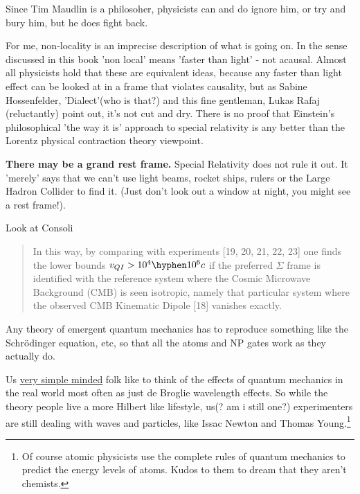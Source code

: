 \documentclass[../rzero]{subfiles}
\begin{document}
Since Tim Maudlin is a philosoher, physicists can and do ignore him, or try and bury him\cite{Werner2014}, but he does fight back\cite{WMaudlin2014}. 

For me, non-locality is an imprecise description of what is going on. In the sense discussed in this book 'non local' means 'faster than light' - not acausal. Almost all physicists hold that these are equivalent ideas, because any faster than light effect can be looked at in a frame that violates causality, but as Sabine Hossenfelder\cite{sabinehossenfelderThinkFasterLight2023}, 'Dialect'(who is that?)\cite{dialectWhatTimeDilation2023} and this fine gentleman, Lukas Rafaj (reluctantly)\cite{physics-problemsandsolutionsOneWaySpeed2023} point out, it's not cut and dry. There is no proof that Einstein's philosophical 'the way it is' approach to special relativity is any better than the Lorentz physical contraction theory viewpoint. 

\textbf{There may be a grand rest frame.} Special Relativity does not rule it out. It 'merely' says that we can't use light beams, rocket ships, rulers or the Large Hadron Collider to find it. (Just don't look out a window at night, you might see a rest frame!).

Look at Consoli \cite{consoliQuantumNonLocalityCMB2022a}

\begin{quotation}
	In this way, by comparing with experiments [19, 20, 21, 22, 23] one finds the lower bounds $v_{QI} > 10^4 \hyphen 10^6c$ if the preferred $\Sigma$ frame is identified with the reference system where the Cosmic Microwave Background (CMB) is seen isotropic, namely that particular system where the observed CMB Kinematic Dipole [18] vanishes exactly. 
\end{quotation}

Any theory of emergent quantum mechanics has to reproduce something like the Schrödinger equation, etc, so that all the atoms and NP gates work as they actually do. 


Us \href{https://youtu.be/p5nWKkyzh_Y?si=eSFOG0lw4fJo7tO2&t=1153}{very simple minded} folk\cite{instituteforadvancedstudySpacetimeQuantumMechanics2021} like to think of the effects of quantum mechanics in the real world most often as just de Broglie wavelength effects. So while the theory people live a more Hilbert like lifestyle, us(? am i still one?) experimenters are still dealing with waves and particles, like Issac Newton and Thomas Young.\footnote{Of course atomic physicists use the complete rules of quantum mechanics to predict the energy levels of atoms. Kudos to them to dream that they aren't chemists.} 
\end{document}
